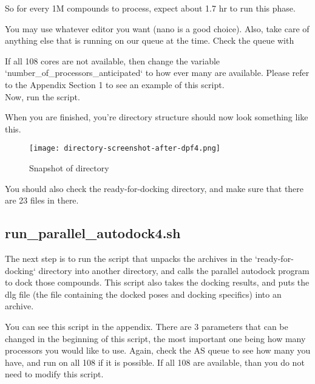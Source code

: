 So for every 1M compounds to process, expect about 1.7 hr to run this phase.



\begin{quote}
\end{quote}

You may use whatever editor you want (nano is a good choice). Also, take care of anything else that is running on our queue at the time. Check the queue with

\begin{quote}
\end{quote}

If all 108 cores are not available, then change the variable `number\_of\_processors\_anticipated` to how ever many are available. Please refer to the Appendix Section 1 to see an example of this script. \\

Now, run the script.

\begin{quote}
\end{quote}


When you are finished, you're directory structure should now look something like this. 

\begin{figure}[h]
  \centering
  \texttt{[image: directory-screenshot-after-dpf4.png]}
  \caption{Snapshot of directory}
\end{figure}

You should also check the ready-for-docking directory, and make sure that there are 23 files in there.

\subsection{run\_parallel\_autodock4.sh}

The next step is to run the script that unpacks the archives in the `ready-for-docking` directory into another directory, and calls the parallel autodock program to dock those compounds. This script also takes the docking results, and puts the dlg file (the file containing the docked poses and docking specifics) into an archive.

You can see this script in the appendix. There are 3 parameters that can be changed in the beginning of this script, the most important one being how many processors you would like to use. Again, check the AS queue to see how many you have, and run on all 108 if it is possible. If all 108 are available, than you do not need to modify this script. 

